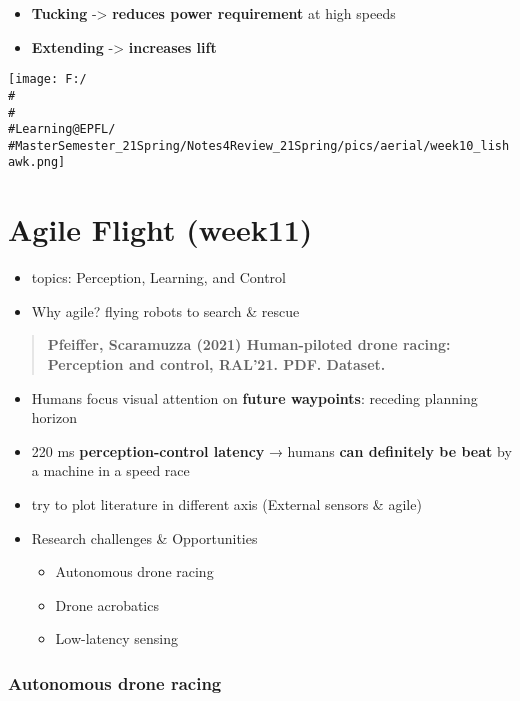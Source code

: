 \documentclass[]{article}
\begin{document}
\begin{itemize}
\item
  \textbf{Tucking} -\textgreater{} \textbf{reduces power requirement} at
  high speeds
\item
  \textbf{Extending} -\textgreater{} \textbf{increases lift}
\end{itemize}

\texttt{[image: F:/\\\#\\\#\\\#Learning@EPFL/\\\#MasterSemester\_21Spring/Notes4Review\_21Spring/pics/aerial/week10\_lishawk.png]}

\section{Agile Flight (week11)}\label{header-n2617}

\begin{itemize}
\item
  topics: Perception, Learning, and Control
\item
  Why agile? flying robots to search \& rescue 
\end{itemize}

\begin{quote}
\textbf{Pfeiffer, Scaramuzza (2021) Human-piloted drone racing:
Perception and control, RAL'21. PDF. Dataset.}
\end{quote}

\begin{itemize}
\item
  Humans focus visual attention on \textbf{future waypoints}: receding
  planning horizon
\item
  220 ms \textbf{perception-control latency} → humans \textbf{can
  definitely be beat} by a machine in a speed race
\item
  try to plot literature in different axis (External sensors \& agile)
\item
  Research challenges \& Opportunities

  \begin{itemize}
  \item
    Autonomous drone racing
  \item
    Drone acrobatics
  \item
    Low-latency sensing
  \end{itemize}
\end{itemize}

\subsubsection{Autonomous drone racing}\label{header-n2641}
\end{document}
